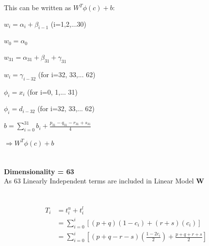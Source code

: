 \documentclass{article}
\begin{document}
\large
This can be written as $W^{T}\phi(c) + b$:
\begin{center}
  \Large$w_i = \alpha_i + \beta_{i-1}$  \large(i=1,2,...30)\\
\end{center}
\begin{center}
  \Large$w_0 = \alpha_0$\\
\end{center}
\begin{center}
  \Large$w_{31} = \alpha_{31} + \beta_{31} + \gamma_{31}$\\
\end{center}
\begin{center}
  \Large$w_i = \gamma_{i-32}$  \large(for i=32, 33,... 62)\\
\end{center}
\begin{center}
  \Large$\phi_i = x_{i}$  \large(for i=0, 1,... 31)\\
\end{center}
\begin{center}
  \Large$\phi_i = d_{i-32}$  \large(for i=32, 33,... 62)\\
\end{center}
\begin{center}
  \Large$b= \sum_{i=0}^{31} b_i + \frac{p_{31} - q_{31} - r_{31} + s_{31}}{4}$\\
\end{center}
\begin{center}
  \Large$\Rightarrow W^{T}\phi(c) + b$\\
\end{center}

\section{}
\large
\textbf{Dimensionality = 63}\\
As 63 Linearly Independent terms are included in Linear Model \textbf{W}


\section{}
\Large
\begin{equation}
  \begin{split}
    T_i &= t_i^{u} + t_i^{l}\\
        &= \sum_{i=0}^{i} [(p+q)(1-c_i) + (r+s)(c_i)]\\
        &= \sum_{i=0}^{i} [(p+q-r-s)(\frac{1-2c_i}{2}) + \frac{p+q+r+s}{2}]
  \end{split}
\end{equation}
\end{document}
